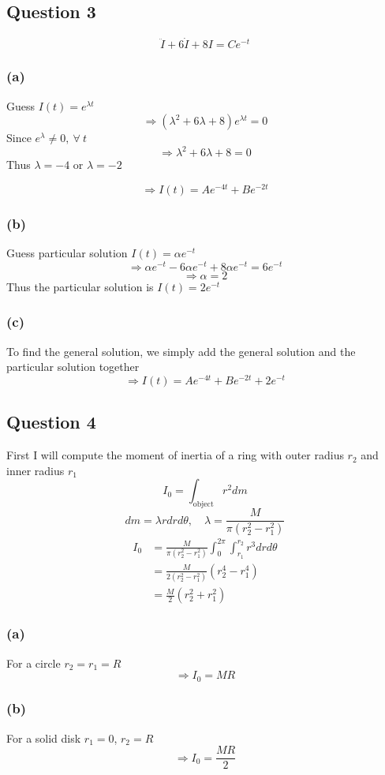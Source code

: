 \documentclass{article}
\begin{document}
\subsection*{Question 3}
\[
\ddot{I} + 6 \dot{I} + 8I = Ce^{-t}
\]
\subsubsection*{(a)}
Guess \(I(t) = e^{\lambda t}\)
\[
\Rightarrow (\lambda^2 + 6\lambda + 8)e^{\lambda t} = 0
\]
Since \(e^{\lambda} \neq 0, \ \forall \ t\)
\[
\Rightarrow \lambda^2 + 6 \lambda + 8 = 0
\]
Thus \(\lambda = -4\) or \(\lambda = -2\)

\[
\Rightarrow I(t) = Ae^{-4t} + Be^{-2 t}
\]

\subsubsection*{(b)}
Guess particular solution \(I(t) = \alpha e^{-t}\)
\[
\Rightarrow \alpha e^{-t} - 6\alpha e^{-t} + 8\alpha e^{-t} = 6e^{-t}
\]
\[
\Rightarrow \alpha = 2
\]
Thus the particular solution is \(I(t) = 2e^{-t}\)

\subsubsection*{(c)}
To find the general solution, we simply add the general solution and the particular solution together
\[
\Rightarrow I(t) = Ae^{-4t} + Be^{-2 t} + 2e^{-t}
\]

\subsection*{Question 4}

First I will compute the moment of inertia of a ring with outer radius \(r_2\) and
inner radius \(r_1\)
\[
I_0 = \int_{\text{object}} r^2 dm
\]
\[
dm = \lambda r dr d \theta, \quad \lambda = \frac{M}{\pi (r_2^2 - r_1^2)}
\]
\begin{align*}
    I_0 &= \frac{M}{\pi (r_2^2 - r_1^2)}\int_{0}^{2\pi} \int_{r_1}^{r_2} r^3 dr d\theta \\
    &= \frac{M}{2(r_2^2 - r_1^2)}(r_2^4 - r_1^4) \\
    &= \frac{M}{2}(r_2^2 + r_1^2)
\end{align*}

\subsubsection*{(a)}
For a circle \(r_2 = r_1 = R\)
\[
\Rightarrow I_0 = MR
\]

\subsubsection*{(b)}
For a solid disk \(r_1 = 0\), \(r_2 = R\)
\[
\Rightarrow I_0 = \frac{MR}{2}
\]
\end{document}
